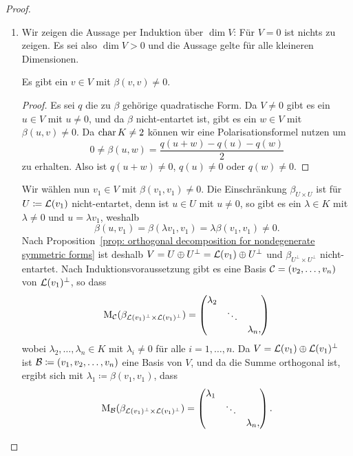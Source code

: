 \documentclass[a4paper,10pt,numbers=noenddot]{scrartcl}
\begin{document}
\begin{proof}
  \begin{enumerate}[leftmargin=*]
    \item
      Wir zeigen die Aussage per Induktion über $\dim V$:
      Für $V = 0$ ist nichts zu zeigen.
      Es sei also $\dim V > 0$ und die Aussage gelte für alle kleineren Dimensionen.
      
      \begin{claim}
        Es gibt ein $v \in V$ mit $\beta(v,v) \neq 0$.
      \end{claim}
      \begin{proof}
        Es sei $q$ die zu $\beta$ gehörige quadratische Form.
        Da $V \neq 0$ gibt es ein $u \in V$ mit $u \neq 0$, und da $\beta$ nicht-entartet ist, gibt es ein $w \in V$ mit $\beta(u,v) \neq 0$.
        Da $\operatorname{char} K \neq 2$ können wir eine Polarisationsformel nutzen um
        \[
                0 
          \neq  \beta(u,w)
          =     \frac{q(u+w)-q(u)-q(w)}{2}
        \]
        zu erhalten.
        Also ist $q(u+w) \neq 0$, $q(u) \neq 0$ oder $q(w) \neq 0$.
      \end{proof}
    
      Wir wählen nun $v_1 \in V$ mit $\beta(v_1,v_1) \neq 0$.
      Die Einschränkung $\beta_{U \times U}$ ist für $U \coloneqq \operatorname{\mathcal{L}}(v_1)$ nicht-entartet, denn ist $u \in U$ mit $u \neq 0$, so gibt es ein $\lambda \in K$ mit $\lambda \neq 0$ und $u = \lambda v_1$, weshalb
      \[
              \beta(u, v_1)
        =     \beta(\lambda v_1, v_1)
        =     \lambda \beta(v_1, v_1)
        \neq  0.
      \]
      Nach Proposition~\ref{prop: orthogonal decomposition for nondegenerate symmetric forms} ist deshalb $V = U \oplus U^\perp = \operatorname{\mathcal{L}}(v_1) \oplus U^\perp$ und $\beta_{U^\perp \times U^\perp}$ nicht-entartet.
      Nach Induktionsvoraussetzung gibt es eine Basis $\mathcal{C} = (v_2, \dotsc, v_n)$ von $\operatorname{\mathcal{L}}(v_1)^\perp$, so dass
      \[
        \operatorname{M}_{\mathcal{C}}(\beta_{\operatorname{\mathcal{L}}(v_1)^\perp \times \operatorname{\mathcal{L}}(v_1)^\perp})
        =
        \begin{pmatrix}
          \lambda_2 &         &           \\
                    & \ddots  &           \\
                    &         & \lambda_n,
        \end{pmatrix}
      \]
      wobei $\lambda_2, \dotsc, \lambda_n \in K$ mit $\lambda_i \neq 0$ für alle $i = 1, \dotsc, n$.
      Da $V = \operatorname{\mathcal{L}}(v_1) \oplus \operatorname{\mathcal{L}}(v_1)^\perp$ ist $\mathcal{B} \coloneqq (v_1, v_2, \dotsc, v_n)$ eine Basis von $V$, und da die Summe orthogonal ist, ergibt sich mit $\lambda_1 \coloneqq \beta(v_1, v_1)$, dass
      \[
        \operatorname{M}_{\mathcal{B}}(\beta_{\operatorname{\mathcal{L}}(v_1)^\perp \times \operatorname{\mathcal{L}}(v_1)^\perp})
        =
        \begin{pmatrix}
          \lambda_1 &         &           \\
                    & \ddots  &           \\
                    &         & \lambda_n,
        \end{pmatrix}.
      \]
      

\end{enumerate}
\end{proof}
\end{document}

